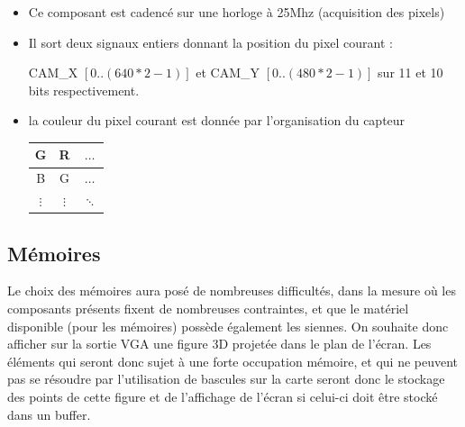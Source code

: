 \documentclass[10pt,a4paper]{report}
\begin{document}
\begin{itemize}
\item Ce composant est cadencé sur une horloge à 25Mhz (acquisition des pixels)
\item Il sort deux signaux entiers donnant la position du pixel courant :

CAM\_X $\left[ 0 .. (640*2-1) \right]$ et CAM\_Y $\left[ 0 .. (480*2-1) \right]$ sur 11 et 10 bits respectivement.
\item la couleur du pixel courant est donnée par l'organisation du capteur

\begin{center}
\begin{tabular}{|c|c|c|}
\hline 
G & R & $\ldots$ \\ 
\hline 
B & G & $\ldots$ \\ 
\hline 
$\vdots$ & $\vdots$ & $\ddots$  \\ 
\hline 
\end{tabular} 
\end{center}

\end{itemize}

\subsection{Mémoires}
Le choix des mémoires aura posé de nombreuses difficultés, dans la mesure où les composants présents fixent de nombreuses contraintes, et que le matériel disponible (pour les mémoires) possède également les siennes.
On souhaite donc afficher sur la sortie VGA une figure 3D projetée dans le plan de l'écran. Les éléments qui seront donc sujet à une forte occupation mémoire, et qui ne peuvent pas se résoudre par l'utilisation de bascules sur la carte seront donc le stockage des points de cette figure et de l'affichage de l'écran si celui-ci doit être stocké dans un buffer.
\end{document}
